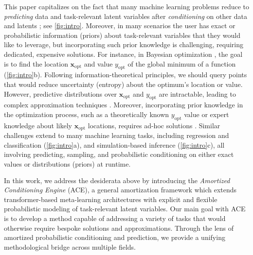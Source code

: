 \documentclass[twoside]{article}
\newcommand{\x}{\mathbf{x}}
\newcommand{\xopt}{\x_\text{opt}}
\newcommand{\yopt}{y_\text{opt}}
\begin{document}
This paper capitalizes on the fact that many machine learning problems reduce to \emph{predicting} data and task-relevant latent variables after \emph{conditioning} on other data and latents \citep{ghahramani2015probabilistic}; see \cref{fig:intro}. 
Moreover, in many scenarios the user has exact or probabilistic information (priors) about task-relevant variables that they would like to leverage, but incorporating such prior knowledge is challenging, requiring dedicated, expensive solutions.
%
For instance, in Bayesian optimization \citep{garnett2023bayesian}, the goal is to find the location $\xopt$ and value $\yopt$ of the global minimum of a function (\cref{fig:intro}b). Following information-theoretical principles, we should query points that would reduce uncertainty (entropy) about the optimum's location or value.
However, predictive distributions over $\xopt$ and $\yopt$ are intractable, leading to complex approximation techniques \citep{hennig2012entropy, hernandez2014predictive, wang2017max}.
Moreover, incorporating prior knowledge in the optimization process, such as a theoretically known $\yopt$ value or expert knowledge about likely $\xopt$ locations, requires ad-hoc solutions \citep{nguyen2020knowing, souza2021bayesian}.
%
Similar challenges extend to many machine learning tasks, including regression and classification (\cref{fig:intro}a), and simulation-based inference (\cref{fig:intro}c),  all involving predicting, sampling, and probabilistic conditioning on either exact values or distributions (priors) at runtime.

In this work, we address the desiderata above by introducing the \emph{Amortized Conditioning Engine} (ACE), a general amortization framework which extends transformer-based meta-learning architectures \citep{nguyen2022transformer, muller2022transformers} with explicit and flexible probabilistic modeling of task-relevant latent variables.
Our main goal with ACE is to develop a method capable of addressing a variety of tasks that would otherwise require bespoke solutions and approximations. Through the lens of amortized probabilistic conditioning and prediction, we provide a unifying methodological bridge across multiple fields.

\vspace{-0.25em}
\end{document}
